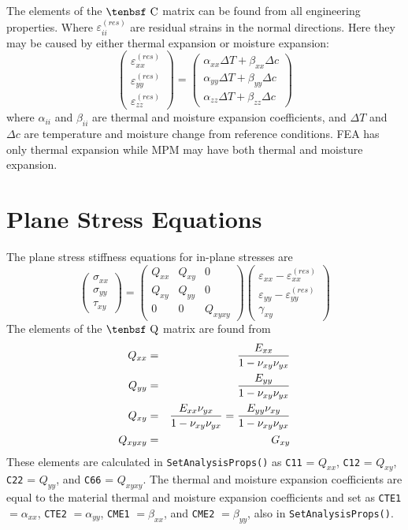 \documentclass[11pt]{book}
\def\a#1{\alpha_{#1}}
\def\b#1{\beta_{#1}}
\def\C{\hbox{\tenbsf C}}
\def\code#1{{\small\tt #1}}
\def\DT{\Delta T}
\def\e#1{\varepsilon_{#1}}
\def\er#1{\varepsilon_{#1}^{(res)}}
\def\g#1{\gamma_{#1}}
\def\Q{\hbox{\tenbsf Q}}
\def\s#1{\sigma_{#1}}
\def\symmat#1#2#3#4#5#6{\left(\begin{array}{ccc} #1 & #2 & #3 \\ #2 & #4 & #5 \\
                                                      #3 & #5 & #6 \end{array}\right)}
\def\t#1{\tau_{#1}}
\def\v#1{\nu_{#1}}
\def\vvec#1#2#3{\left(\begin{array}{ccc} #1 \\ #2 \\ #3 \end{array}\right)}
\begin{document}
The elements of the $\C$ matrix can be found from all engineering properties. Where $\er{ii}$ are  residual strains in the normal directions. Here they may be caused by either thermal expansion or moisture expansion:
\begin{equation}
\left(\begin{array}{c} \er{xx} \\ \er{yy} \\ \er{zz} \end{array}\right)
       =  \left(\begin{array}{c}
	\a{xx}\DT + \b{xx}\Delta c \\
	\a{yy}\DT + \b{yy}\Delta c \\
	\a{zz}\DT + \b{zz}\Delta c  \end{array}\right)
\end{equation}
where $\a{ii}$ and $\b{ii}$ are thermal and moisture expansion coefficients, and $\DT$ and $\Delta c$ are temperature and moisture change from reference conditions. FEA has only thermal expansion while MPM may have both thermal and moisture expansion.

\section{Plane Stress Equations}

The plane stress stiffness equations for in-plane stresses are
\begin{equation}
      \vvec{\s{xx}}{\s{yy}}{\t{xy}} = \symmat{Q_{xx}}{Q_{xy}}{0}{Q_{yy}}{0}{Q_{xyxy}}
          \vvec{\e{xx} - \er{xx}}{\e{yy} - \er{yy}}{\g{xy}}
 \end{equation}
The elements of the $\Q$ matrix are found from
\begin{eqnarray}%
   Q_{xx} &  = &  {E_{xx}\over 1 - \v{xy}\v{yx}} \\
   Q_{yy} & = & {E_{yy}\over 1 - \v{xy}\v{yx}} \\
   Q_{xy} &  = & {E_{xx}\v{yx}\over 1 - \v{xy}\v{yx}}  =  {E_{yy}\v{xy}\over 1 - \v{xy}\v{yx}}\\
   Q_{xyxy} & = &  G_{xy} 
\end{eqnarray}%
These elements are calculated in \code{SetAnalysisProps()} as \code{C11} = $Q_{xx}$, \code{C12} = $Q_{xy}$, \code{C22} = $Q_{yy}$, and \code{C66} = $Q_{xyxy}$. The thermal  and moisture expansion coefficients are equal to the material thermal  and moisture expansion coefficients and set as \code{CTE1} $=\a{xx}$, \code{CTE2} $=\a{yy}$, \code{CME1} $=\b{xx}$, and \code{CME2} $=\b{yy}$, also in \code{SetAnalysisProps()}.
\end{document}
